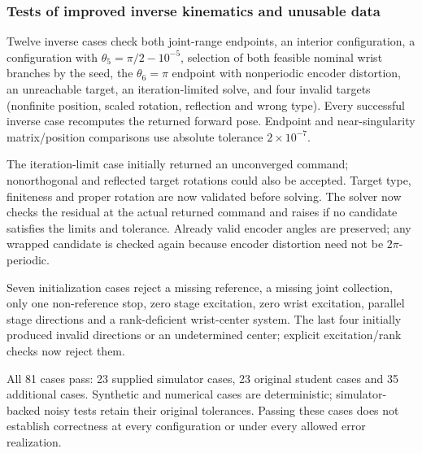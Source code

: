 \documentclass[../main.tex]{subfiles}
\begin{document}
\subsubsection{Tests of improved inverse kinematics and unusable data}
Twelve inverse cases check both joint-range endpoints, an interior configuration, a configuration with $\theta_5=\pi/2-10^{-5}$, selection of both feasible nominal wrist branches by the seed, the $\theta_6=\pi$ endpoint with nonperiodic encoder distortion, an unreachable target, an iteration-limited solve, and four invalid targets (nonfinite position, scaled rotation, reflection and wrong type). Every successful inverse case recomputes the returned forward pose. Endpoint and near-singularity matrix/position comparisons use absolute tolerance $2\times10^{-7}$.

The iteration-limit case initially returned an unconverged command; nonorthogonal and reflected target rotations could also be accepted. Target type, finiteness and proper rotation are now validated before solving. The solver now checks the residual at the actual returned command and raises  if no candidate satisfies the limits and tolerance. Already valid encoder angles are preserved; any wrapped candidate is checked again because encoder distortion need not be $2\pi$-periodic.

Seven initialization cases reject a missing reference, a missing joint collection, only one non-reference stop, zero stage excitation, zero wrist excitation, parallel stage directions and a rank-deficient wrist-center system. The last four initially produced invalid directions or an undetermined center; explicit excitation/rank checks now reject them.

All 81 cases pass: 23 supplied simulator cases, 23 original student cases and 35 additional cases. Synthetic and numerical cases are deterministic; simulator-backed noisy tests retain their original tolerances. Passing these cases does not establish correctness at every configuration or under every allowed error realization.
\end{document}
